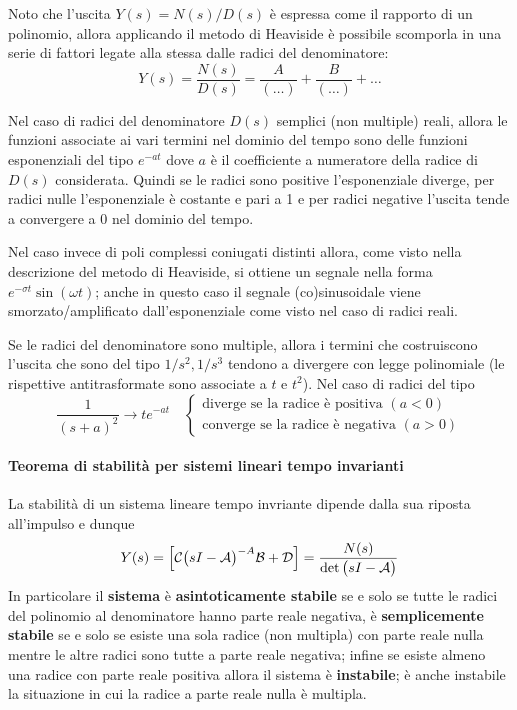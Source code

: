 		Noto che l'uscita $Y(s) =N(s)/D(s)$ è espressa come il rapporto di un polinomio, allora applicando il metodo di Heaviside è possibile scomporla in una serie di fattori legate alla stessa dalle radici del denominatore:
		\[ Y(s) = \frac{N(s)}{D(s)} = \frac A {(\dots)} + \frac B {(\dots)} + \dots \]
		
		Nel caso di radici del denominatore $D(s)$ semplici (non multiple) reali, allora le funzioni associate ai vari termini nel dominio del tempo sono delle funzioni esponenziali del tipo $e^{-at}$ dove $a$ è il coefficiente a numeratore della radice di $D(s)$ considerata. Quindi se le radici sono positive l'esponenziale diverge, per radici nulle l'esponenziale è costante e pari a 1 e per radici negative l'uscita tende a convergere a 0 nel dominio del tempo.
		
		Nel caso invece di poli complessi coniugati distinti allora, come visto nella descrizione del metodo di Heaviside, si ottiene un segnale nella forma $e^{-\sigma t} \sin(\omega t)$; anche in questo caso il segnale (co)sinusoidale viene smorzato/amplificato dall'esponenziale come visto nel caso di radici reali.
		
		Se le radici del denominatore sono multiple, allora i termini che costruiscono l'uscita che sono del tipo $1/s^2,1/s^3$  tendono a divergere con legge polinomiale (le rispettive antitrasformate sono associate a $t$ e $t^2$). Nel caso di radici del tipo
		\[ \frac 1 {(s+a)^2} \rightarrow t e^{-at}  \quad \begin{cases}
			\textrm{diverge se la radice è positiva }(a < 0) \\
			\textrm{converge se la radice è negativa }(a > 0)
		\end{cases}\]
	
		\paragraph{Teorema di stabilità per sistemi lineari tempo invarianti} La stabilità di un sistema lineare tempo invriante dipende dalla sua riposta all'impulso e dunque
		\[ Y(s) = \Big[\mathcal C\big(sI-\mathcal A\big)^{-A} \mathcal B + \mathcal D\Big] = \frac {N(s)}{\det\big(sI-\mathcal A\big)}\]
		In particolare il \textbf{sistema} è \textbf{asintoticamente stabile} se e solo se tutte le radici del polinomio al denominatore hanno parte reale negativa, è \textbf{semplicemente stabile} se e solo se esiste una sola radice (non multipla) con parte reale nulla mentre le altre radici sono tutte a parte reale negativa; infine se esiste almeno una radice con parte reale positiva allora il sistema è \textbf{instabile}; è anche instabile la situazione in cui la radice a parte reale nulla è multipla.
		
